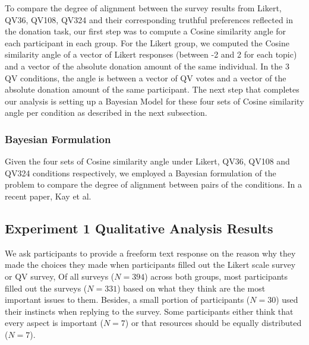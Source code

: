 To compare the degree of alignment between the survey results from Likert, QV36, QV108, QV324 and their corresponding truthful preferences reflected in the donation task, our first step was to compute a Cosine similarity angle for each participant in each group. For the Likert group, we computed the Cosine similarity angle of a vector of Likert responses (between -2 and 2 for each topic) and a vector of the absolute donation amount of the same individual. In the 3 QV conditions, the angle is between a vector of QV votes and a vector of the absolute donation amount of the same participant. The next step that completes our analysis is setting up a Bayesian Model for these four sets of Cosine similarity angle per condition as described in the next subsection.


\subsubsection{Bayesian Formulation}

Given the four sets of Cosine similarity angle under Likert, QV36, QV108 and QV324 conditions respectively, we employed a Bayesian formulation of the problem to compare the degree of alignment between pairs of the conditions. In a recent paper, Kay et al. \cite{kay2016researcher} 

    
    
\subsection{Experiment 1 Qualitative Analysis Results}\label{results-1-qual}
We ask participants to provide a freeform text response on the reason why they made the choices they made
when participants filled out the Likert scale survey or QV survey,
Of all surveys ($N=394$) across both groups, most participants filled out the surveys ($N=331$) based on what they think are the most important issues to them. %
Besides, a small portion of participants ($N=30$) used their instincts when replying to the survey.
Some participants either think that every aspect is important ($N=7$) or that resources should be equally distributed ($N=7$).

